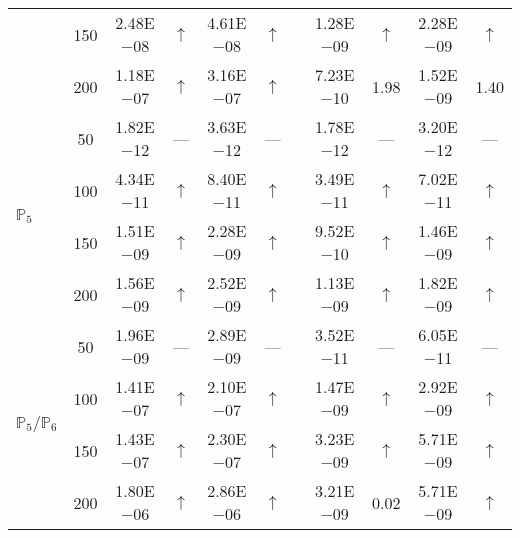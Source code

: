 \begin{table}[H]
{\begin{tabular}{@{}l c c c c c c c c c c@{}}
 & 150 & 2.48E$-$08 & $\uparrow$  & 4.61E$-$08 & $\uparrow$ &  & 1.28E$-$09 & $\uparrow$ & 2.28E$-$09 & $\uparrow$\\
 & 200 & 1.18E$-$07 & $\uparrow$  & 3.16E$-$07 & $\uparrow$ &  & 7.23E$-$10 & 1.98 & 1.52E$-$09 & 1.40\\
\midrule
\multirow{4}{*}{$\mathbb{P}_{5}$}
 & 50 & 1.82E$-$12 & ---  & 3.63E$-$12 & --- &  & 1.78E$-$12 & --- & 3.20E$-$12 & ---\\
 & 100 & 4.34E$-$11 & $\uparrow$  & 8.40E$-$11 & $\uparrow$ &  & 3.49E$-$11 & $\uparrow$ & 7.02E$-$11 & $\uparrow$\\
 & 150 & 1.51E$-$09 & $\uparrow$  & 2.28E$-$09 & $\uparrow$ &  & 9.52E$-$10 & $\uparrow$ & 1.46E$-$09 & $\uparrow$\\
 & 200 & 1.56E$-$09 & $\uparrow$  & 2.52E$-$09 & $\uparrow$ &  & 1.13E$-$09 & $\uparrow$ & 1.82E$-$09 & $\uparrow$\\
\midrule
\multirow{4}{*}{$\mathbb{P}_{5}/\mathbb{P}_{6}$}
 & 50 & 1.96E$-$09 & ---  & 2.89E$-$09 & --- &  & 3.52E$-$11 & --- & 6.05E$-$11 & ---\\
 & 100 & 1.41E$-$07 & $\uparrow$  & 2.10E$-$07 & $\uparrow$ &  & 1.47E$-$09 & $\uparrow$ & 2.92E$-$09 & $\uparrow$\\
 & 150 & 1.43E$-$07 & $\uparrow$  & 2.30E$-$07 & $\uparrow$ &  & 3.23E$-$09 & $\uparrow$ & 5.71E$-$09 & $\uparrow$\\
 & 200 & 1.80E$-$06 & $\uparrow$  & 2.86E$-$06 & $\uparrow$ &  & 3.21E$-$09 & 0.02 & 5.71E$-$09 & $\uparrow$\\
\bottomrule
\end{tabular}}
\label{none}
\end{table}
